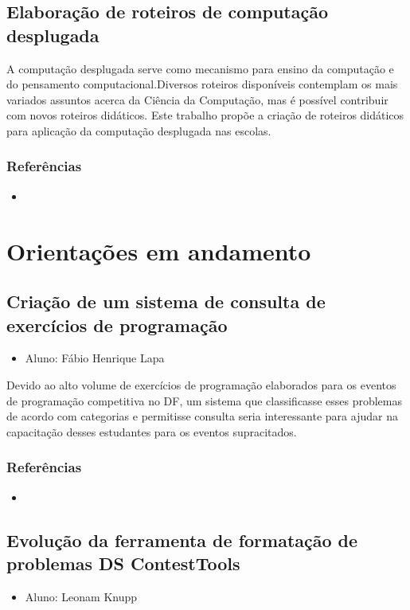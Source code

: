 \documentclass{article}
\newcommand*{\nsubsection}[1]{
    \subsection{#1}
}
\begin{document}
\nsubsection{Elaboração de roteiros de computação desplugada}

A computação desplugada serve como mecanismo para ensino da computação e do pensamento computacional.Diversos roteiros disponíveis contemplam os mais variados assuntos acerca da Ciência da Computação, mas é possível contribuir com novos roteiros didáticos. Este trabalho propõe a criação de roteiros didáticos para aplicação da computação desplugada nas escolas.

\subsubsection*{Referências}

\begin{itemize}
	\item {}
\end{itemize}

\newpage

\section{Orientações em andamento}



\nsubsection{Criação de um sistema de consulta de exercícios de programação}

\begin{itemize}
	\item Aluno: Fábio Henrique Lapa
\end{itemize}

Devido ao alto volume de exercícios de programação elaborados para os eventos de programação competitiva no DF, um sistema que classificasse esses problemas de acordo com categorias e permitisse consulta seria interessante para ajudar na capacitação desses estudantes para os eventos supracitados.



\subsubsection*{Referências}

\begin{itemize}
	\item {}
\end{itemize}


\nsubsection{Evolução da ferramenta de formatação de problemas DS ContestTools}


\begin{itemize}
	\item Aluno: Leonam Knupp
\end{itemize}
\end{document}
